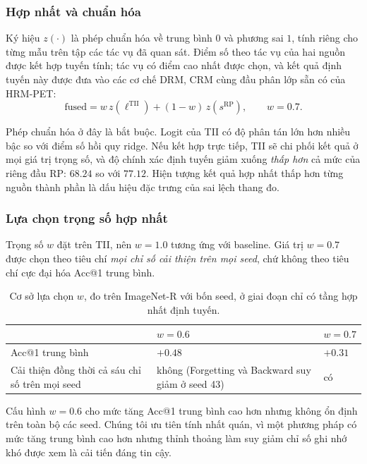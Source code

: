 \documentclass[11pt,a4paper]{article}
\begin{document}
\subsubsection{Hợp nhất và chuẩn hóa}

Ký hiệu $z(\cdot)$ là phép chuẩn hóa về trung bình $0$ và phương sai $1$, tính
riêng cho từng mẫu trên tập các tác vụ đã quan sát. Điểm số theo tác vụ của hai
nguồn được kết hợp tuyến tính; tác vụ có điểm cao nhất được chọn, và kết quả
định tuyến này được đưa vào các cơ chế DRM, CRM cùng đầu phân lớp sẵn có của
HRM-PET:
\begin{equation}
\mathrm{fused} = w\, z(\ell^{\mathrm{TII}}) + (1-w)\, z(s^{\mathrm{RP}}),
\qquad w = 0.7 .
\label{eq:route}
\end{equation}

Phép chuẩn hóa ở đây là bắt buộc. Logit của TII có độ phân tán lớn hơn nhiều bậc
so với điểm số hồi quy ridge. Nếu kết hợp trực tiếp, TII sẽ chi phối kết quả ở
mọi giá trị trọng số, và độ chính xác định tuyến giảm xuống \emph{thấp hơn} cả
mức của riêng đầu RP: $68.24$ so với $77.12$. Hiện tượng kết quả hợp nhất thấp
hơn từng nguồn thành phần là dấu hiệu đặc trưng của sai lệch thang đo.

\subsubsection{Lựa chọn trọng số hợp nhất}
\label{sec:choose-w}

Trọng số $w$ đặt trên TII, nên $w = 1.0$ tương ứng với baseline. Giá trị $w = 0.7$
được chọn theo tiêu chí \emph{mọi chỉ số cải thiện trên mọi seed}, chứ không theo
tiêu chí cực đại hóa Acc@1 trung bình.

\begin{table}[htbp]
\centering
\caption{Cơ sở lựa chọn $w$, đo trên ImageNet-R với bốn seed, ở giai đoạn chỉ có
tầng hợp nhất định tuyến.}
\label{tab:choose-w}
\begin{tabular}{@{}p{5.4cm}p{4.6cm}p{2.6cm}@{}}
\toprule
 & $w = 0.6$ & $w = 0.7$ \\
\midrule
Acc@1 trung bình & $+0.48$ & $+0.31$ \\
Cải thiện đồng thời cả sáu chỉ số trên mọi seed
  & không (Forgetting và Backward suy giảm ở seed 43) & có \\
\bottomrule
\end{tabular}
\end{table}

Cấu hình $w = 0.6$ cho mức tăng Acc@1 trung bình cao hơn nhưng không ổn định trên
toàn bộ các seed. Chúng tôi ưu tiên tính nhất quán, vì một phương pháp có mức
tăng trung bình cao hơn nhưng thỉnh thoảng làm suy giảm chỉ số ghi nhớ khó được
xem là cải tiến đáng tin cậy.
\end{document}
